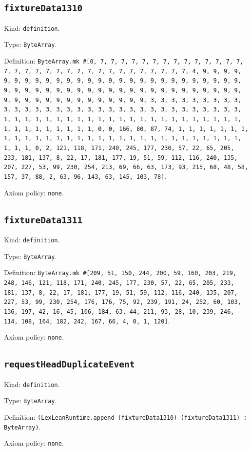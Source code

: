 \documentclass[11pt]{article}
\begin{document}
\subsection*{\texttt{fixtureData1310}}
\noindent Kind: \texttt{definition}.\par
\noindent Type: \texttt{ByteArray}.\par
\noindent Definition: \texttt{ByteArray.mk \#[0, 7, 7, 7, 7, 7, 7, 7, 7, 7, 7, 7, 7, 7, 7, 7, 7, 7, 7, 7, 7, 7, 7, 7, 7, 7, 7, 7, 7, 7, 7, 7, 7, 4, 9, 9, 9, 9, 9, 9, 9, 9, 9, 9, 9, 9, 9, 9, 9, 9, 9, 9, 9, 9, 9, 9, 9, 9, 9, 9, 9, 9, 9, 9, 9, 9, 9, 9, 9, 9, 9, 9, 9, 9, 9, 9, 9, 9, 9, 9, 9, 9, 9, 9, 9, 9, 9, 9, 9, 9, 9, 9, 9, 9, 9, 9, 9, 9, 3, 3, 3, 3, 3, 3, 3, 3, 3, 3, 3, 3, 3, 3, 3, 3, 3, 3, 3, 3, 3, 3, 3, 3, 3, 3, 3, 3, 3, 3, 3, 3, 1, 1, 1, 1, 1, 1, 1, 1, 1, 1, 1, 1, 1, 1, 1, 1, 1, 1, 1, 1, 1, 1, 1, 1, 1, 1, 1, 1, 1, 1, 1, 1, 0, 0, 166, 80, 87, 74, 1, 1, 1, 1, 1, 1, 1, 1, 1, 1, 1, 1, 1, 1, 1, 1, 1, 1, 1, 1, 1, 1, 1, 1, 1, 1, 1, 1, 1, 1, 1, 1, 1, 0, 2, 121, 118, 171, 240, 245, 177, 230, 57, 22, 65, 205, 233, 181, 137, 8, 22, 17, 181, 177, 19, 51, 59, 112, 116, 240, 135, 207, 227, 53, 99, 230, 254, 213, 69, 66, 63, 173, 93, 215, 68, 48, 58, 157, 37, 88, 2, 63, 96, 143, 63, 145, 103, 78]}.\par
\noindent Axiom policy: \texttt{none}.\par
\subsection*{\texttt{fixtureData1311}}
\noindent Kind: \texttt{definition}.\par
\noindent Type: \texttt{ByteArray}.\par
\noindent Definition: \texttt{ByteArray.mk \#[209, 51, 150, 244, 200, 59, 160, 203, 219, 248, 146, 121, 118, 171, 240, 245, 177, 230, 57, 22, 65, 205, 233, 181, 137, 8, 22, 17, 181, 177, 19, 51, 59, 112, 116, 240, 135, 207, 227, 53, 99, 230, 254, 176, 176, 75, 92, 239, 191, 24, 252, 60, 103, 136, 197, 42, 16, 45, 106, 184, 63, 44, 211, 93, 28, 10, 239, 246, 114, 108, 164, 182, 242, 167, 66, 4, 0, 1, 120]}.\par
\noindent Axiom policy: \texttt{none}.\par
\subsection*{\texttt{requestHeadDuplicateEvent}}
\noindent Kind: \texttt{definition}.\par
\noindent Type: \texttt{ByteArray}.\par
\noindent Definition: \texttt{(LexLeanRuntime.append (fixtureData1310) (fixtureData1311) : ByteArray)}.\par
\noindent Axiom policy: \texttt{none}.\par
\end{document}
